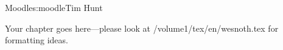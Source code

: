 \begin{aosachapter}{Moodle}{s:moodle}{Tim Hunt}

Your chapter goes here---please look at /volume1/tex/en/wesnoth.tex for 
formatting ideas.

\end{aosachapter}
